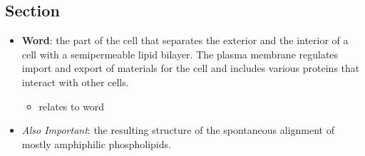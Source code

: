 \documentclass[12pt,a4paper]{article}
\begin{document}
\subsection{Section}
\begin{itemize}
    \item \textbf{Word}: the part of the cell that separates the exterior and the interior of a cell with a semipermeable lipid bilayer. The plasma membrane regulates import and export of materials for the cell and includes various proteins that interact with other cells. 
    \begin{itemize}
        \item relates to word
    \end{itemize}
    \item \textit{Also Important}: the resulting structure of the spontaneous alignment of mostly amphiphilic phospholipids. 
\end{itemize}
\end{document}
